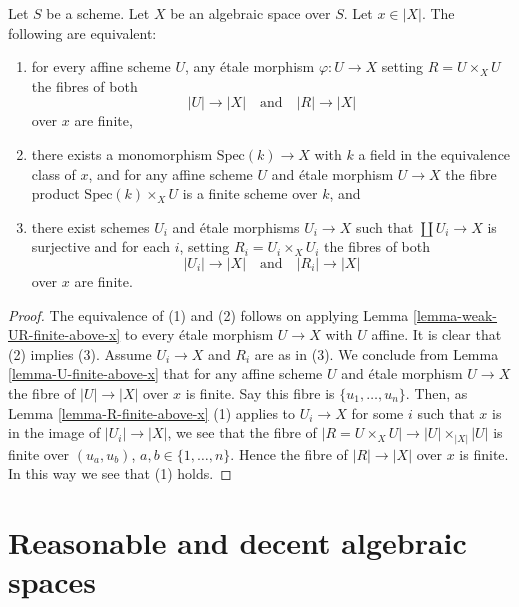 \begin{lemma}
\label{lemma-UR-finite-above-x}
Let $S$ be a scheme. Let $X$ be an algebraic space over $S$.
Let $x \in |X|$. The following are equivalent:
\begin{enumerate}
\item for every affine scheme $U$, any \'etale morphism
$\varphi : U \to X$ setting $R = U \times_X U$ the fibres of both
$$
|U| \longrightarrow |X|
\quad\text{and}\quad
|R| \longrightarrow |X|
$$
over $x$ are finite,
\item there exists a monomorphism $\text{Spec}(k) \to X$ with $k$ a field
in the equivalence class of $x$, and for any affine scheme $U$ and \'etale
morphism $U \to X$ the fibre product $\text{Spec}(k) \times_X U$ is
a finite scheme over $k$, and
\item there exist schemes $U_i$ and \'etale morphisms
$U_i \to X$ such that $\coprod U_i \to X$ is surjective and for each
$i$, setting $R_i = U_i \times_X U_i$ the fibres of both
$$
|U_i| \longrightarrow |X|
\quad\text{and}\quad
|R_i| \longrightarrow |X|
$$
over $x$ are finite.
\end{enumerate}
\end{lemma}

\begin{proof}
The equivalence of (1) and (2) follows on applying
Lemma \ref{lemma-weak-UR-finite-above-x} to every \'etale morphism
$U \to X$ with $U$ affine. It is clear that (2) implies (3).
Assume $U_i \to X$ and $R_i$ are as in (3). We conclude from
Lemma \ref{lemma-U-finite-above-x}
that for any affine scheme $U$ and \'etale morphism $U \to X$
the fibre of $|U| \to |X|$ over $x$ is finite.
Say this fibre is $\{u_1, \ldots, u_n\}$.
Then, as
Lemma \ref{lemma-R-finite-above-x} (1)
applies to $U_i \to X$ for some $i$ such that $x$ is in the image of
$|U_i| \to |X|$, we see that the fibre of
$|R = U \times_X U| \to |U| \times_{|X|} |U|$
is finite over $(u_a, u_b)$, $a, b \in \{1, \ldots, n\}$.
Hence the fibre of $|R| \to |X|$ over $x$ is finite.
In this way we see that (1) holds.
\end{proof}







\section{Reasonable and decent algebraic spaces}
\label{section-reasonable-decent}

